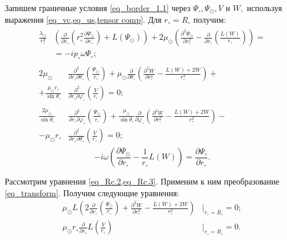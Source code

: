Запишем граничные условия \cref{eq_border_1.1} через $\Psi_\circ, \Psi_\odot, V$ и $W,$ используя выражения \cref{eq_vc,eq_us,tensor comp}. Для $r_\circ=R_\circ$ получим:
\begin{align}
\begin{split}
\frac{\lambda_\odot}{r_\circ^2}&\left(\frac{\partial}{\partial r_\circ}\left(r_\circ^2\frac{\partial\Psi_\odot}{\partial r_\circ}\right)+L(\Psi_\odot)\right) + 2\mu_\odot\left(\frac{\partial^2 \Psi_\odot}{\partial r_\circ^2} - \frac{\partial}{\partial r_\circ}\left(\frac{L(W)}{r_\circ}\right)\right) = \\
& = - ip_\circ\omega\Psi_\circ;
\end{split}\label{eq_Rc.1}\\
\begin{split}
2\mu_\odot&\frac{\partial^2}{\partial r_\circ\partial\theta_\circ}\left(\frac{\Psi_\odot}{r_\circ}\right)+ \mu_\odot\frac{\partial}{\partial\theta_\circ}\left(\frac{\partial^2 W}{\partial r_\circ^2} - \frac{L(W) + 2W}{r_\circ^2}\right) + \\
+ \frac{\mu_\odot r_\circ}{\sin\theta_\circ}&\frac{\partial^2}{\partial r_\circ\partial\varphi_\circ}\left(\frac{V}{r_\circ}\right) = 0;
\end{split}\label{eq_Rc.2}\\
\begin{split}
\frac{2\mu_\odot}{\sin\theta_\circ}&\frac{\partial^2}{\partial r_\circ\partial\varphi_\circ}\left(\frac{\Psi_\odot}{r_\circ}\right)+ \frac{\mu_\odot}{\sin\theta_\circ}\frac{\partial}{\partial\varphi_\circ}\left(\frac{\partial^2 W}{\partial r_\circ^2} - \frac{L(W) + 2W}{r_\circ^2}\right) - \\
- \mu_\odot r_\circ&\frac{\partial^2}{\partial r_\circ\partial\theta_\circ}\left(\frac{V}{r_\circ}\right) = 0;
\end{split}\label{eq_Rc.3}
\end{align}
\begin{equation}\label{eq_Rc.4}
-i\omega \left(\frac{\partial \Psi_\odot}{\partial r_\circ} - \frac{1}{r_\circ}L(W)\right) = \frac{\partial \Psi_\circ}{\partial r_\circ}.
\end{equation}

Рассмотрим уравнения \cref{eq_Rc.2,eq_Rc.3}. Применим к ним преобразование \cref{eq_transform}. Получим следующие уравнения:
\begin{align}
\mu_\odot L\!\left(2\frac{\partial}{\partial r_\circ}\left(\frac{\Psi_\odot}{r_\circ}\right) + \frac{\partial^2 W}{\partial r_\circ^2} - \frac{L(W) + 2W}{r_\circ^2}\right)&\Biggr|_{r_\circ=R_\circ}=0;\label{eq_Rc.2.2}\\
\mu_\odot r_\circ\frac{\partial}{\partial r_\circ}L\!\left(\frac{V}{r_\circ}\right)&\Biggr|_{r_\circ=R_\circ} = 0.\label{eq_Rc.3.2}
\end{align}

